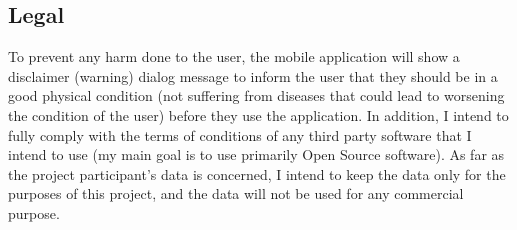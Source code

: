     
    \subsection{Legal}
    To prevent any harm done to the user, the mobile application will show a disclaimer (warning) dialog message to inform the user that they should be in a good physical condition (not suffering from diseases that could lead to worsening the condition of the user) before they use the application. In addition, I intend to fully comply with the terms of conditions of any third party software that I intend to use (my main goal is to use primarily Open Source software). As far as the project participant’s data is concerned, I intend to keep the data only for the purposes of this project, and the data will not be used for any commercial purpose. 

